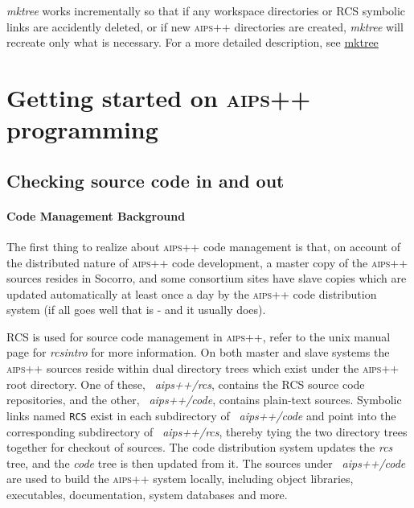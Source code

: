 \textit{mktree} works incrementally so that if any workspace directories or
\textsc{RCS} symbolic links are accidently deleted, or if new \textsc{aips++}
directories are created, \textit{mktree} will recreate only what is necessary.
For a more detailed description, see \hyperref{mktree}{mktree (see AIPS++ System Manual, Section }{ for more details)}{mktree}


\label{Programming}
\section{Getting started on \textsc{aips++} programming}

\label{Checkout}
\subsection{Checking source code in and out}
\paragraph{Code Management Background}
The first thing to realize about \textsc{aips++} code management is that, on
account of the distributed nature of \textsc{aips++} code development, a master
copy of the \textsc{aips++} sources resides in Socorro, and some consortium
sites have slave copies which are updated automatically at least once a day
by the \textsc{aips++} code distribution system (if all goes well that is -
and it usually does).

RCS is used for source code management in \textsc{aips++}, refer to the unix
manual page for \textit{rcsintro} for more information.  On both master and slave
systems the \textsc{aips++} sources reside within dual directory trees which exist
under the \textsc{aips++} root directory.   One of these, \textsl{~aips++/rcs},
contains the RCS source code repositories, and the other, \textsl{~aips++/code},
contains plain-text sources.  Symbolic links named \texttt{RCS} exist in each
subdirectory of \textsl{~aips++/code} and point into the corresponding
subdirectory of \textsl{~aips++/rcs}, thereby tying the two directory trees
together for checkout of sources.  The code distribution system updates the
\textsl{rcs} tree, and the \textsl{code} tree is then updated from it.  The
sources under \textsl{~aips++/code} are used to build the \textsc{aips++} system
locally, including object libraries, executables, documentation, system
databases and more.

